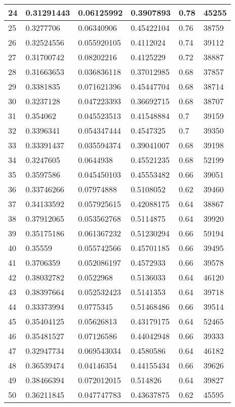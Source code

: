 \begin{longtable}{|l|l|l|l|l|l|}
24 & 0.31291443 & 0.06125992 & 0.3907893 & 0.78 & 45255 \\ \hline 
25 & 0.3277706 & 0.06340906 & 0.45422104 & 0.76 & 38759 \\ \hline 
26 & 0.32524556 & 0.055920105 & 0.4112024 & 0.74 & 39112 \\ \hline 
27 & 0.31700742 & 0.08202216 & 0.4125229 & 0.72 & 38887 \\ \hline 
28 & 0.31663653 & 0.036836118 & 0.37012985 & 0.68 & 37857 \\ \hline 
29 & 0.3381835 & 0.071621396 & 0.45447704 & 0.68 & 38714 \\ \hline 
30 & 0.3237128 & 0.047223393 & 0.36692715 & 0.68 & 38707 \\ \hline 
31 & 0.354062 & 0.045523513 & 0.41548884 & 0.7 & 39159 \\ \hline 
32 & 0.3396341 & 0.054347444 & 0.4547325 & 0.7 & 39350 \\ \hline 
33 & 0.33391437 & 0.035594374 & 0.39041007 & 0.68 & 39198 \\ \hline 
34 & 0.3247605 & 0.0644938 & 0.45521235 & 0.68 & 52199 \\ \hline 
35 & 0.3597586 & 0.045450103 & 0.45553482 & 0.66 & 39051 \\ \hline 
36 & 0.33746266 & 0.07974888 & 0.5108052 & 0.62 & 39460 \\ \hline 
37 & 0.34133592 & 0.057925615 & 0.42088175 & 0.64 & 38867 \\ \hline 
38 & 0.37912065 & 0.053562768 & 0.5114875 & 0.64 & 39920 \\ \hline 
39 & 0.35175186 & 0.061367232 & 0.51230294 & 0.66 & 59194 \\ \hline 
40 & 0.35559 & 0.055742566 & 0.45701185 & 0.66 & 39495 \\ \hline 
41 & 0.3706359 & 0.052086197 & 0.4572933 & 0.66 & 39578 \\ \hline 
42 & 0.38032782 & 0.0522968 & 0.5136033 & 0.64 & 46120 \\ \hline 
43 & 0.38397664 & 0.052532423 & 0.5141353 & 0.64 & 39718 \\ \hline 
44 & 0.33373994 & 0.0775345 & 0.51468486 & 0.66 & 39514 \\ \hline 
45 & 0.35404125 & 0.05626813 & 0.43179175 & 0.64 & 52465 \\ \hline 
46 & 0.35481527 & 0.07126586 & 0.44042948 & 0.66 & 39333 \\ \hline 
47 & 0.32947734 & 0.069543034 & 0.4580586 & 0.64 & 46182 \\ \hline 
48 & 0.36539474 & 0.04146354 & 0.44155434 & 0.66 & 39626 \\ \hline 
49 & 0.38466394 & 0.072012015 & 0.514826 & 0.64 & 39827 \\ \hline 
50 & 0.36211845 & 0.047747783 & 0.43637875 & 0.62 & 45595 \\ \hline 
\end{longtable}